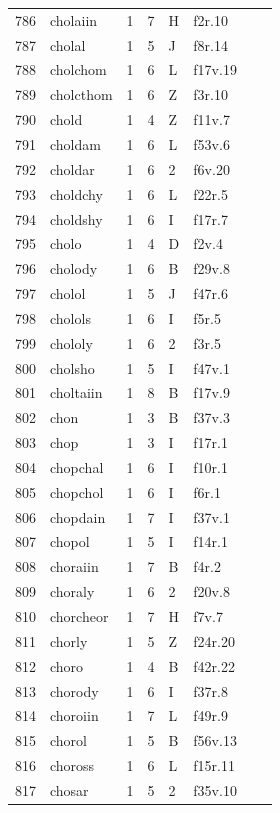 \documentclass[11pt,a4paper]{article}
\begin{document}
\begin{landscape}
\begin{longtable}{@{}r>{\ttfamily}lrrl>{\ttfamily}l>{\raggedright\arraybackslash}p{80mm}>{\raggedright\arraybackslash}p{36mm}@{}}
786 & cholaiin & 1 & 7 & H & f2r.10 &  & \\
787 & cholal & 1 & 5 & J & f8r.14 &  & \\
788 & cholchom & 1 & 6 & L & f17v.19 &  & \\
789 & cholcthom & 1 & 6 & Z & f3r.10 &  & \\
790 & chold & 1 & 4 & Z & f11v.7 &  & \\
791 & choldam & 1 & 6 & L & f53v.6 &  & \\
792 & choldar & 1 & 6 & 2 & f6v.20 &  & \\
793 & choldchy & 1 & 6 & L & f22r.5 &  & \\
794 & choldshy & 1 & 6 & I & f17r.7 &  & \\
795 & cholo & 1 & 4 & D & f2v.4 &  & \\
796 & cholody & 1 & 6 & B & f29v.8 &  & \\
797 & cholol & 1 & 5 & J & f47r.6 &  & \\
798 & cholols & 1 & 6 & I & f5r.5 &  & \\
799 & chololy & 1 & 6 & 2 & f3r.5 &  & \\
800 & cholsho & 1 & 5 & I & f47v.1 &  & \\
801 & choltaiin & 1 & 8 & B & f17v.9 &  & \\
802 & chon & 1 & 3 & B & f37v.3 &  & \\
803 & chop & 1 & 3 & I & f17r.1 &  & \\
804 & chopchal & 1 & 6 & I & f10r.1 &  & \\
805 & chopchol & 1 & 6 & I & f6r.1 &  & \\
806 & chopdain & 1 & 7 & I & f37v.1 &  & \\
807 & chopol & 1 & 5 & I & f14r.1 &  & \\
808 & choraiin & 1 & 7 & B & f4r.2 &  & \\
809 & choraly & 1 & 6 & 2 & f20v.8 &  & \\
810 & chorcheor & 1 & 7 & H & f7v.7 &  & \\
811 & chorly & 1 & 5 & Z & f24r.20 &  & \\
812 & choro & 1 & 4 & B & f42r.22 &  & \\
813 & chorody & 1 & 6 & I & f37r.8 &  & \\
814 & choroiin & 1 & 7 & L & f49r.9 &  & \\
815 & chorol & 1 & 5 & B & f56v.13 &  & \\
816 & choross & 1 & 6 & L & f15r.11 &  & \\
817 & chosar & 1 & 5 & 2 & f35v.10 &  & \\

\end{longtable}
\end{landscape}
\end{document}

